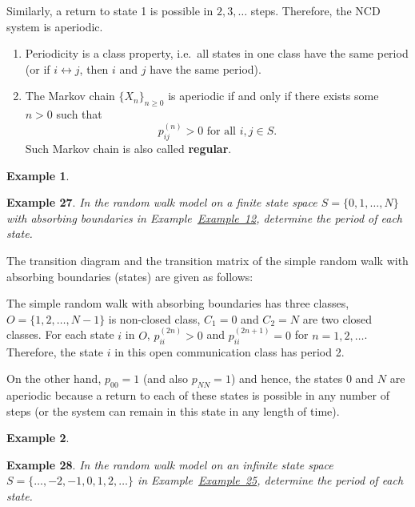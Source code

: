 \documentclass[
]{book}
\theoremstyle{definition}
\theoremstyle{definition}
\newtheorem{example}{Example}[chapter]
\theoremstyle{definition}
\theoremstyle{definition}
\theoremstyle{remark}
\begin{document}
Similarly, a return to state 1 is possible in \(2,3, \ldots\) steps.
Therefore, the NCD system is aperiodic.

\begin{enumerate}
\def\labelenumi{\arabic{enumi}.}
\item
  Periodicity is a class property, i.e.~all states in one class have
  the same period (or if \(i \leftrightarrow j\), then \(i\) and \(j\) have
  the same period).
\item
  The Markov chain \(\{X_n\}_{n\ge 0}\) is aperiodic if and only if
  there exists some \(n >0\) such that
  \[p^{(n)}_{ij} > 0 \text{ for all } i,j \in S.\] Such Markov chain
  is also called \textbf{regular}.
\end{enumerate}

\begin{example}
\protect\hypertarget{exm:unlabeled-div-29}{}\label{exm:unlabeled-div-29}

\textbf{Example 27}. \emph{In the random walk model on a finite state space
\(S = \{0,1,\ldots, N\}\) with absorbing boundaries in
Example~\protect\hyperlink{simpleRW}{Example~12}, determine the period of each state.}

\end{example}

The transition diagram and the transition matrix of the simple random
walk with absorbing boundaries (states) are given as follows:

The simple random walk with absorbing boundaries has three classes,
\(O = \{1, 2, \ldots, N - 1\}\) is non-closed class, \(C_1 = {0}\) and
\(C_2 = {N}\) are two closed classes. For each state \(i\) in \(O\),
\(p^{(2n)}_{ii} > 0\) and \(p^{(2n+1)}_{ii} = 0\) for \(n = 1,2,\ldots\).
Therefore, the state \(i\) in this open communication class has period 2.

On the other hand, \(p_{00} = 1\) (and also \(p_{NN} = 1\)) and hence, the
states \(0\) and \(N\) are aperiodic because a return to each of these
states is possible in any number of steps (or the system can remain in
this state in any length of time).

\begin{example}
\protect\hypertarget{exm:unlabeled-div-30}{}\label{exm:unlabeled-div-30}

\textbf{Example 28}. \emph{In the random walk model on an infinite state space
\(S = \{\ldots,-2,-1,0,1,2, \ldots \}\) in
Example~\protect\hyperlink{rwInfiniteS}{Example~25}, determine the period of each state.}

\end{example}
\end{document}
